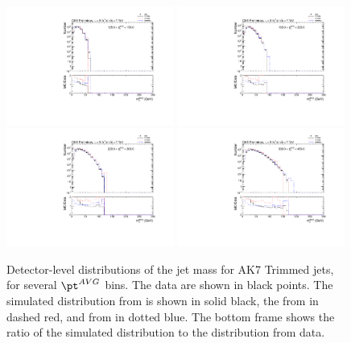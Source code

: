 \begin{figure}[htbp]
\centering
\includegraphics[width=0.49\textwidth]{figs/histAK7MjetVsPtAvg_rawDataMCComparisons_pt_2_Trimmed}
\includegraphics[width=0.49\textwidth]{figs/histAK7MjetVsPtAvg_rawDataMCComparisons_pt_3_Trimmed}
\includegraphics[width=0.49\textwidth]{figs/histAK7MjetVsPtAvg_rawDataMCComparisons_pt_4_Trimmed}
\includegraphics[width=0.49\textwidth]{figs/histAK7MjetVsPtAvg_rawDataMCComparisons_pt_5_Trimmed}
\caption{Detector-level distributions of the jet mass for AK7 Trimmed jets,
for several $\pt^{AVG}$ bins. The data are shown in black points.
The simulated distribution from \PYTHIA is shown in solid black, 
the from \PYTHIAEIGHT in dashed red, and from \HERWIG in dotted blue. 
The bottom frame shows the ratio of the simulated distribution
to the distribution from data. 
\label{figs:histAK7MjetVsPtAvg_rawDataMCComparisons_pt_2_Trimmed}}
\end{figure}

